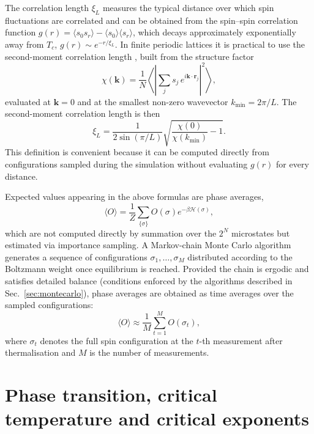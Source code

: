 The correlation length $\xi_L$ measures the typical distance over which spin fluctuations are correlated and can be obtained from the spin–spin correlation function $g(r)=\langle s_0 s_r\rangle-\langle s_0\rangle\langle s_r\rangle$, which decays approximately exponentially away from $T_c$, $g(r)\sim e^{-r/\xi_L}$. In finite periodic lattices it is practical to use the second-moment correlation length \citep{Cooper1982, Newman1999}, built from the structure factor
\begin{equation} \label{eq:structure_factor}
    \chi(\mathbf{k}) = \frac{1}{N}\left\langle \left| \sum_j s_j\, e^{i\mathbf{k}\cdot\mathbf{r}_j} \right|^2 \right\rangle,
\end{equation}
evaluated at $\mathbf{k}=0$ and at the smallest non-zero wavevector $k_{\min}=2\pi/L$. The second-moment correlation length is then
\begin{equation} \label{eq:xi_def}
    \xi_L = \frac{1}{2\sin(\pi/L)}\sqrt{\frac{\chi(0)}{\chi(k_{\min})} - 1}.
\end{equation}
This definition is convenient because it can be computed directly from configurations sampled during the simulation without evaluating $g(r)$ for every distance.

Expected values appearing in the above formulas are phase averages,
\[ \langle O \rangle = \frac{1}{Z}\sum_{\{\sigma\}} O(\sigma) e^{-\beta\mathcal{H}(\sigma)}, \]
which are not computed directly by summation over the $2^N$ microstates but estimated via importance sampling. A Markov-chain Monte Carlo algorithm generates a sequence of configurations $\sigma_1,\dots,\sigma_M$ distributed according to the Boltzmann weight once equilibrium is reached. Provided the chain is ergodic and satisfies detailed balance (conditions enforced by the algorithms described in Sec.~\ref{sec:montecarlo}), phase averages are obtained as time averages over the sampled configurations:
\[ \langle O \rangle \approx \frac{1}{M}\sum_{t=1}^M O(\sigma_t), \]
where $\sigma_t$ denotes the full spin configuration at the $t$-th measurement after thermalisation and $M$ is the number of measurements.




\section{Phase transition, critical temperature and critical exponents}

